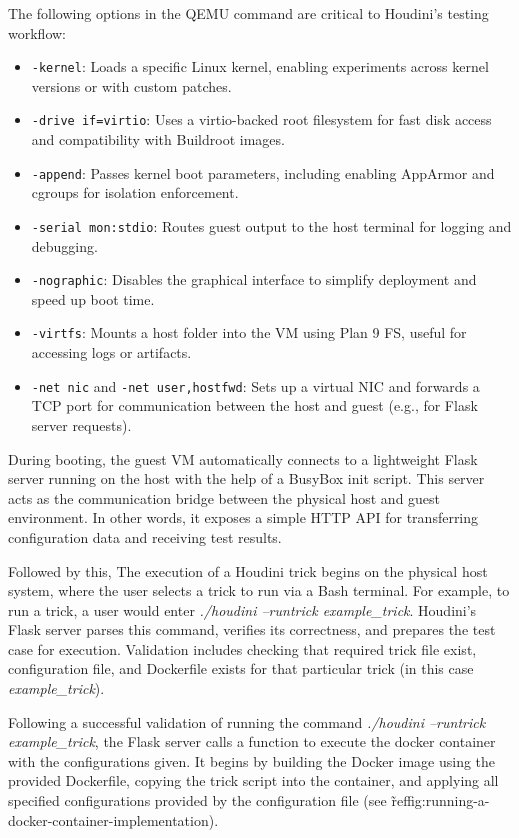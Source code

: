 \documentclass[12pt]{report}
\begin{document}
\begin{doublespace}
The following options in the QEMU command are critical to Houdini's testing workflow:

\begin{itemize}
\item \texttt{-kernel}: Loads a specific Linux kernel, enabling experiments across kernel versions or with custom patches.
\item \texttt{-drive if=virtio}: Uses a virtio-backed root filesystem for fast disk access and compatibility with Buildroot images.
\item \texttt{-append}: Passes kernel boot parameters, including enabling AppArmor and cgroups for isolation enforcement.
\item \texttt{-serial mon:stdio}: Routes guest output to the host terminal for logging and debugging.
\item \texttt{-nographic}: Disables the graphical interface to simplify deployment and speed up boot time.
\item \texttt{-virtfs}: Mounts a host folder into the VM using Plan 9 FS, useful for accessing logs or artifacts.
\item \texttt{-net nic} and \texttt{-net user,hostfwd}: Sets up a virtual NIC and forwards a TCP port for communication between the host and guest (e.g., for Flask server requests).
\end{itemize}

During booting, the guest VM automatically connects to a lightweight Flask server running on the host with the help of a BusyBox init script. This server acts as the communication bridge between the physical host and guest environment. In other words, it exposes a simple HTTP API for transferring configuration data and receiving test results.

Followed by this, The execution of a Houdini trick begins on the physical host system, where the user selects a trick to run via a Bash terminal. For example, to run a trick, a user would enter \textit{./houdini --runtrick example\_trick}. Houdini’s Flask server parses this command, verifies its correctness, and prepares the test case for execution. Validation includes checking that required trick file exist, configuration file, and Dockerfile exists for that particular trick (in this case \textit{example\_trick}).

Following a successful validation of running the command \textit{./houdini --runtrick example\_trick}, the Flask server calls a function to execute the docker container with the configurations given. It begins by building the Docker image using the provided Dockerfile, copying the trick script into the container, and applying all specified configurations provided by the configuration file (see \~ref{fig:running-a-docker-container-implementation}).


\end{doublespace}
\end{document}
